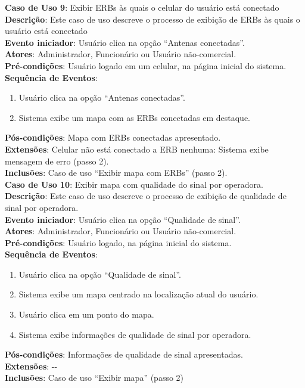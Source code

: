 \documentclass[]{politex}
\begin{document}
\noindent \textbf{Caso de Uso 9}: Exibir ERBs às quais o celular do usuário está
conectado \\
\textbf{Descrição}: Este caso de uso descreve o processo de exibição de ERBs às
quais o usuário está conectado \\
\textbf{Evento iniciador}: Usuário clica na opção ``Antenas conectadas''. \\
\textbf{Atores}: Administrador, Funcionário ou Usuário não-comercial. \\
\textbf{Pré-condições}: Usuário logado em um celular, na página inicial do
sistema. \\
\textbf{Sequência de Eventos}:
\begin{enumerate}
\item Usuário clica na opção ``Antenas conectadas''.
\item Sistema exibe um mapa com as ERBs conectadas em destaque.
\end{enumerate}
\textbf{Pós-condições}: Mapa com ERBs conectadas apresentado. \\
\textbf{Extensões}: Celular não está conectado a ERB nenhuma: Sistema exibe
mensagem de erro (passo 2). \\
\textbf{Inclusões}: Caso de uso ``Exibir mapa com ERBs'' (passo 2). \\

\noindent \textbf{Caso de Uso 10}: Exibir mapa com qualidade do sinal por
operadora. \\
\textbf{Descrição}: Este caso de uso descreve o processo de exibição de
qualidade de sinal por operadora. \\
\textbf{Evento iniciador}: Usuário clica na opção ``Qualidade de sinal''. \\
\textbf{Atores}: Administrador, Funcionário ou Usuário não-comercial. \\
\textbf{Pré-condições}: Usuário logado, na página inicial do sistema. \\
\textbf{Sequência de Eventos}:
\begin{enumerate}
\item Usuário clica na opção ``Qualidade de sinal''.
\item Sistema exibe um mapa centrado na localização atual do usuário.
\item Usuário clica em um ponto do mapa.
\item Sistema exibe informações de qualidade de sinal por operadora.
\end{enumerate}
\textbf{Pós-condições}: Informações de qualidade de sinal apresentadas. \\
\textbf{Extensões}: -{}- \\
\textbf{Inclusões}: Caso de uso ``Exibir mapa'' (passo 2) \\
\end{document}
